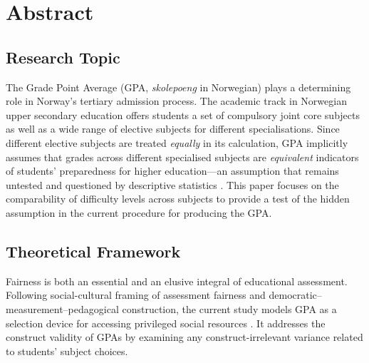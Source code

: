 \section{Abstract}


\subsection{Research Topic}



The Grade Point Average (GPA, \textit{skolepoeng} in Norwegian) plays a determining role in Norway's tertiary admission process. The academic track in Norwegian upper secondary education offers students a set of compulsory joint core subjects as well as a wide range of elective subjects for different specialisations. Since different elective subjects are treated \emph{equally} in its calculation, GPA implicitly assumes that grades across different specialised subjects are \emph{equivalent} indicators of students' preparedness for higher education---an assumption that remains untested and questioned by descriptive statistics \parencite{udir:2022}. This paper focuses on the comparability of difficulty levels across subjects to provide a test of the hidden assumption in the current procedure for producing the GPA.

\subsection{Theoretical Framework}


Fairness is both an essential and an elusive integral of educational assessment. Following  social-cultural framing of assessment fairness and  democratic--measurement--pedagogical construction, the current study models GPA as a selection device \parencite{kane:2013} for accessing privileged social resources \parencite{bourdieu:1973}. It addresses the construct validity of GPAs by examining any construct-irrelevant variance \parencite{messick:1989} related to students' subject choices.

